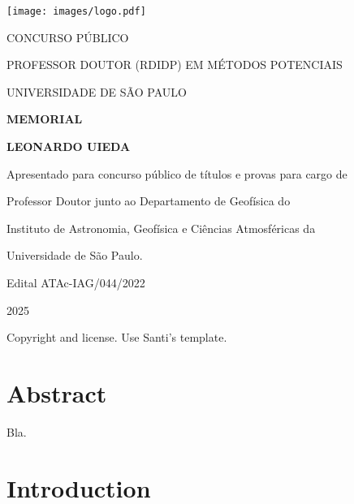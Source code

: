 \documentclass[10pt,a4paper,oneside]{book}
\newcommand{\ThesisYear}{2025}
\newcommand{\ThesisAuthor}{Leonardo Uieda}
\begin{document}
\pagestyle{plain}
\frontmatter

\begin{titlepage}
  \begin{center}
    \texttt{[image: images/logo.pdf]}
    \vspace{1cm}

    CONCURSO PÚBLICO

    PROFESSOR DOUTOR (RDIDP) EM MÉTODOS POTENCIAIS

    UNIVERSIDADE DE SÃO PAULO
    \vspace{5cm}

    \textbf{\LARGE MEMORIAL}
    \vspace{1cm}

    \textbf{\LARGE \MakeUppercase{\ThesisAuthor{}}}
    \vspace{5cm}

    {\small
      Apresentado para concurso público de títulos e provas para cargo de

      Professor Doutor junto ao Departamento de Geofísica do

      Instituto de Astronomia, Geofísica e Ciências Atmosféricas da

      Universidade de São Paulo.
      \vspace{1cm}

      Edital ATAc-IAG/044/2022
    }
    \vfill

    \ThesisYear{}
  \end{center}
\end{titlepage}



Copyright and license. Use Santi's template.

\chapter*{Abstract}

Bla.

\tableofcontents

\mainmatter
\pagestyle{fancy}

\chapter{Introduction}
\end{document}
